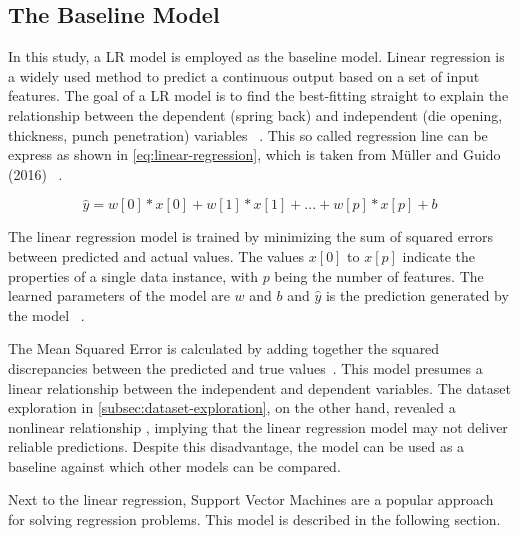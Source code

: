 
\subsection{The Baseline Model}\label{subsec:regression-models}
In this study, a \ac{LR} model is employed as the baseline model.
Linear regression is a widely used method to predict a continuous output  based on a set
of input features.
The goal of a \ac{LR} model is to find the best-fitting straight to explain the relationship between the dependent
(spring back) and independent (die opening, thickness, punch penetration)
variables
~\cite[pp. 45--46]{muller2016introduction}.
This so called regression line can be express as shown in \cref{eq:linear-regression}, which is taken from
Müller and Guido (2016)
~\cite[p. 45]{muller2016introduction}.

\begin{tcolorbox}[arc=0pt,boxrule=0.5pt]
    \begin{equation}
        \hat{y} = w[0] * x[0] + w[1] * x[1] + ... + w[p] * x[p] + b
        \label{eq:linear-regression}
    \end{equation}
\end{tcolorbox}

The linear regression model is trained by minimizing the sum of squared errors between predicted and actual values.
The values $x[0]$ to $x[p]$ indicate the properties of a single data instance, with $p$ being the number of
features.
The learned parameters of the model are $w$ and $b$ and $\hat{y}$  is the prediction generated by the model
~\cite[p. 45]{muller2016introduction}.

The Mean Squared Error is calculated by adding together the squared discrepancies between the predicted and true
values~\cite[p. 47--68]{muller2016introduction}.
This model presumes a linear relationship between the independent and dependent variables.
The dataset exploration in \cref{subsec:dataset-exploration}, on the other hand, revealed a nonlinear relationship
, implying that the linear regression model may not deliver reliable predictions.
Despite this disadvantage, the model can be used as a baseline against which other models can be compared.

Next to the linear regression, Support Vector Machines are a popular approach for solving regression problems.
This model is described in the following section.

